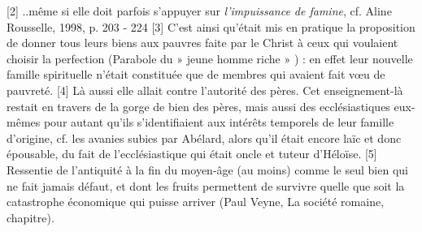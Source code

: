 [2] ..même si elle doit parfois s'appuyer sur \emph{l'impuissance de famine}, cf. Aline Rousselle, 1998, p. 203 - 224
[3] C'est ainsi qu'était mis en pratique la proposition de donner tous leurs biens aux pauvres faite par le Christ à ceux qui voulaient choisir la perfection (Parabole du » jeune homme riche » ) : en effet leur nouvelle famille spirituelle n'était constituée que de membres qui avaient fait vœu de pauvreté.
[4] Là aussi elle allait contre l'autorité des pères. Cet enseignement-là restait en travers de la gorge de bien des pères, mais aussi des ecclésiastiques eux-mêmes pour autant qu'ils s'identifiaient aux intérêts temporels de leur famille d'origine, cf. les avanies subies par Abélard, alors qu'il était encore laïc et donc épousable, du fait de l'ecclésiastique qui était oncle et tuteur d'Héloïse.
[5] Ressentie de l'antiquité à la fin du moyen-âge (au moins) comme le seul bien qui ne fait jamais défaut, et dont les fruits permettent de survivre quelle que soit la catastrophe économique qui puisse arriver (Paul Veyne, La société romaine, chapitre).